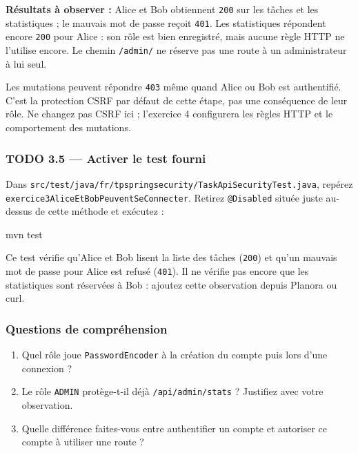 \documentclass[
  french,
  10pt,
  a4paper,
]{article}
\newenvironment{Shaded}{}{}
\newcommand{\ExtensionTok}[1]{#1}
\newcommand{\NormalTok}[1]{#1}
\providecommand{\tightlist}{%
  \setlength{\itemsep}{0pt}\setlength{\parskip}{0pt}}
\begin{document}
\textbf{Résultats à observer :} Alice et Bob obtiennent \texttt{200} sur
les tâches et les statistiques ; le mauvais mot de passe reçoit
\texttt{401}. Les statistiques répondent encore \texttt{200} pour Alice
: son rôle est bien enregistré, mais aucune règle HTTP ne l'utilise
encore. Le chemin \texttt{/admin/} ne réserve pas une route à un
administrateur à lui seul.

Les mutations peuvent répondre \texttt{403} même quand Alice ou Bob est
authentifié. C'est la protection CSRF par défaut de cette étape, pas une
conséquence de leur rôle. Ne changez pas CSRF ici ; l'exercice 4
configurera les règles HTTP et le comportement des mutations.

\subsubsection{TODO 3.5 --- Activer le test
fourni}\label{todo-3.5-activer-le-test-fourni}

Dans
\texttt{src/test/java/fr/tpspringsecurity/TaskApiSecurityTest.java},
repérez \texttt{exercice3AliceEtBobPeuventSeConnecter}. Retirez
\texttt{@Disabled} située juste au-dessus de cette méthode et exécutez :

\begin{Shaded}
\begin{Highlighting}[]
\ExtensionTok{mvn}\NormalTok{ test}
\end{Highlighting}
\end{Shaded}

Ce test vérifie qu'Alice et Bob lisent la liste des tâches
(\texttt{200}) et qu'un mauvais mot de passe pour Alice est refusé
(\texttt{401}). Il ne vérifie pas encore que les statistiques sont
réservées à Bob : ajoutez cette observation depuis Planora ou curl.

\subsubsection{Questions de
compréhension}\label{questions-de-compruxe9hension-1}

\begin{enumerate}
\def\labelenumi{\arabic{enumi}.}
\tightlist
\item
  Quel rôle joue \texttt{PasswordEncoder} à la création du compte puis
  lors d'une connexion ?
\item
  Le rôle \texttt{ADMIN} protège-t-il déjà \texttt{/api/admin/stats} ?
  Justifiez avec votre observation.
\item
  Quelle différence faites-vous entre authentifier un compte et
  autoriser ce compte à utiliser une route ?
\end{enumerate}
\end{document}
